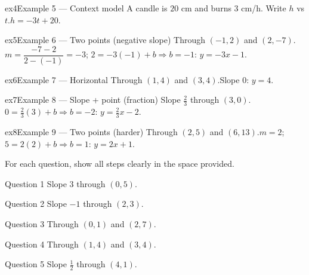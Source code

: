 \documentclass[11pt]{article}
\begin{document}
\begin{example}{ex4}{Example 5 --- Context model}
A candle is $20$ cm and burns $3$ cm/h. Write $h$ vs $t$.\soln $h=-3t+20$.
\end{example}

\begin{example}{ex5}{Example 6 --- Two points (negative slope)}
Through $(-1,2)$ and $(2,-7)$.\soln $m=\dfrac{-7-2}{2-(-1)}=-3$; $2=-3(-1)+b\Rightarrow b=-1$: $y=-3x-1$.
\end{example}

\begin{example}{ex6}{Example 7 --- Horizontal}
Through $(1,4)$ and $(3,4)$.\soln Slope $0$: $y=4$.
\end{example}

\begin{example}{ex7}{Example 8 --- Slope + point (fraction)}
Slope $\tfrac23$ through $(3,0)$.\soln $0=\tfrac23(3)+b\Rightarrow b=-2$: $y=\tfrac23x-2$.
\end{example}

\begin{example}{ex8}{Example 9 --- Two points (harder)}
Through $(2,5)$ and $(6,13)$.\soln $m=2$; $5=2(2)+b\Rightarrow b=1$: $y=2x+1$.
\end{example}

\clearpage
{}
For each question, show all steps clearly in the space provided.

\begin{qbox}{Question 1}
Slope $3$ through $(0,5)$.\workspace{1.8cm}
\end{qbox}

\begin{qbox}{Question 2}
Slope $-1$ through $(2,3)$.\workspace{2.0cm}
\end{qbox}

\begin{qbox}{Question 3}
Through $(0,1)$ and $(2,7)$.\workspace{2.0cm}
\end{qbox}

\begin{qbox}{Question 4}
Through $(1,4)$ and $(3,4)$.\workspace{2.0cm}
\end{qbox}

\begin{qbox}{Question 5}
Slope $\tfrac12$ through $(4,1)$.\workspace{2.0cm}
\end{qbox}
\end{document}
